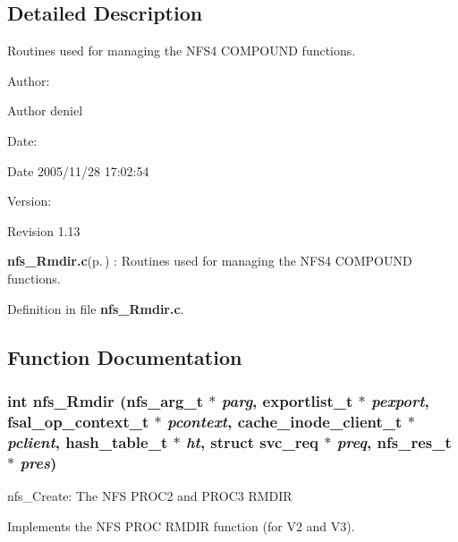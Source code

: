 \subsection{Detailed Description}
Routines used for managing the NFS4 COMPOUND functions. 

\begin{Desc}
\item[Author:]\begin{Desc}
\item[Author]deniel \end{Desc}
\end{Desc}
\begin{Desc}
\item[Date:]\begin{Desc}
\item[Date]2005/11/28 17:02:54 \end{Desc}
\end{Desc}
\begin{Desc}
\item[Version:]\begin{Desc}
\item[Revision]1.13 \end{Desc}
\end{Desc}
{\bf nfs\_\-Rmdir.c}{\rm (p.\,\pageref{nfs__Rmdir_8c})} : Routines used for managing the NFS4 COMPOUND functions.

Definition in file {\bf nfs\_\-Rmdir.c}.

\subsection{Function Documentation}
\subsubsection{\setlength{\rightskip}{0pt plus 5cm}int nfs\_\-Rmdir (nfs\_\-arg\_\-t $\ast$ {\em parg}, exportlist\_\-t $\ast$ {\em pexport}, fsal\_\-op\_\-context\_\-t $\ast$ {\em pcontext}, cache\_\-inode\_\-client\_\-t $\ast$ {\em pclient}, hash\_\-table\_\-t $\ast$ {\em ht}, struct svc\_\-req $\ast$ {\em preq}, nfs\_\-res\_\-t $\ast$ {\em pres})}\label{nfs__Rmdir_8c_a0}


nfs\_\-Create: The NFS PROC2 and PROC3 RMDIR

Implements the NFS PROC RMDIR function (for V2 and V3).

